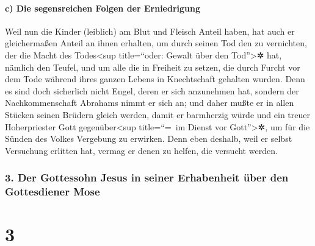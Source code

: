 \hypertarget{c-die-segensreichen-folgen-der-erniedrigung}{%
\paragraph{c) Die segensreichen Folgen der
Erniedrigung}\label{c-die-segensreichen-folgen-der-erniedrigung}}

 Weil nun die Kinder (leiblich) am Blut und Fleisch
Anteil haben, hat auch er gleichermaßen Anteil an ihnen erhalten, um
durch seinen Tod den zu vernichten, der die Macht des Todes\textless sup
title=``oder: Gewalt über den Tod''\textgreater✲ hat, nämlich den
Teufel,  und um alle die in Freiheit zu setzen, die durch
Furcht vor dem Tode während ihres ganzen Lebens in Knechtschaft gehalten
wurden.  Denn es sind doch sicherlich nicht Engel, deren
er sich anzunehmen hat, sondern der Nachkommenschaft Abrahams nimmt er
sich an;  und daher mußte er in allen Stücken seinen
Brüdern gleich werden, damit er barmherzig würde und ein treuer
Hoherpriester Gott gegenüber\textless sup title=``=~im Dienst vor
Gott''\textgreater✲, um für die Sünden des Volkes Vergebung zu erwirken.
 Denn eben deshalb, weil er selbst Versuchung erlitten
hat, vermag er denen zu helfen, die versucht werden.

\hypertarget{der-gottessohn-jesus-in-seiner-erhabenheit-uxfcber-den-gottesdiener-mose}{%
\subsubsection{3. Der Gottessohn Jesus in seiner Erhabenheit über den
Gottesdiener
Mose}\label{der-gottessohn-jesus-in-seiner-erhabenheit-uxfcber-den-gottesdiener-mose}}

\hypertarget{section-2}{%
\section{3}\label{section-2}}

